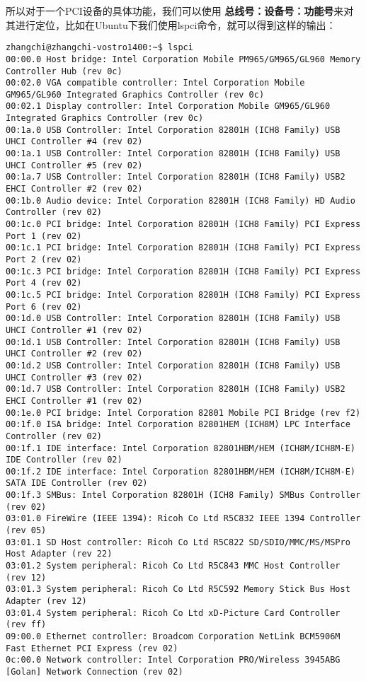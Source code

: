\documentclass{article}
\begin{document}
\begin{CJK*}{UTF8}{gkai}
\begin{description}
所以对于一个PCI设备的具体功能，我们可以使用 {\bfseries 总线号：设备号：功能号}来对其进行定位，比如在Ubuntu下我们使用lspci命令，就可以得到这样的输出：

\begin{lstlisting}[style=console, basicstyle=\tiny\color{green}\ttfamily\bfseries]
zhangchi@zhangchi-vostro1400:~$ lspci 
00:00.0 Host bridge: Intel Corporation Mobile PM965/GM965/GL960 Memory Controller Hub (rev 0c)
00:02.0 VGA compatible controller: Intel Corporation Mobile GM965/GL960 Integrated Graphics Controller (rev 0c)
00:02.1 Display controller: Intel Corporation Mobile GM965/GL960 Integrated Graphics Controller (rev 0c)
00:1a.0 USB Controller: Intel Corporation 82801H (ICH8 Family) USB UHCI Controller #4 (rev 02)
00:1a.1 USB Controller: Intel Corporation 82801H (ICH8 Family) USB UHCI Controller #5 (rev 02)
00:1a.7 USB Controller: Intel Corporation 82801H (ICH8 Family) USB2 EHCI Controller #2 (rev 02)
00:1b.0 Audio device: Intel Corporation 82801H (ICH8 Family) HD Audio Controller (rev 02)
00:1c.0 PCI bridge: Intel Corporation 82801H (ICH8 Family) PCI Express Port 1 (rev 02)
00:1c.1 PCI bridge: Intel Corporation 82801H (ICH8 Family) PCI Express Port 2 (rev 02)
00:1c.3 PCI bridge: Intel Corporation 82801H (ICH8 Family) PCI Express Port 4 (rev 02)
00:1c.5 PCI bridge: Intel Corporation 82801H (ICH8 Family) PCI Express Port 6 (rev 02)
00:1d.0 USB Controller: Intel Corporation 82801H (ICH8 Family) USB UHCI Controller #1 (rev 02)
00:1d.1 USB Controller: Intel Corporation 82801H (ICH8 Family) USB UHCI Controller #2 (rev 02)
00:1d.2 USB Controller: Intel Corporation 82801H (ICH8 Family) USB UHCI Controller #3 (rev 02)
00:1d.7 USB Controller: Intel Corporation 82801H (ICH8 Family) USB2 EHCI Controller #1 (rev 02)
00:1e.0 PCI bridge: Intel Corporation 82801 Mobile PCI Bridge (rev f2)
00:1f.0 ISA bridge: Intel Corporation 82801HEM (ICH8M) LPC Interface Controller (rev 02)
00:1f.1 IDE interface: Intel Corporation 82801HBM/HEM (ICH8M/ICH8M-E) IDE Controller (rev 02)
00:1f.2 IDE interface: Intel Corporation 82801HBM/HEM (ICH8M/ICH8M-E) SATA IDE Controller (rev 02)
00:1f.3 SMBus: Intel Corporation 82801H (ICH8 Family) SMBus Controller (rev 02)
03:01.0 FireWire (IEEE 1394): Ricoh Co Ltd R5C832 IEEE 1394 Controller (rev 05)
03:01.1 SD Host controller: Ricoh Co Ltd R5C822 SD/SDIO/MMC/MS/MSPro Host Adapter (rev 22)
03:01.2 System peripheral: Ricoh Co Ltd R5C843 MMC Host Controller (rev 12)
03:01.3 System peripheral: Ricoh Co Ltd R5C592 Memory Stick Bus Host Adapter (rev 12)
03:01.4 System peripheral: Ricoh Co Ltd xD-Picture Card Controller (rev ff)
09:00.0 Ethernet controller: Broadcom Corporation NetLink BCM5906M Fast Ethernet PCI Express (rev 02)
0c:00.0 Network controller: Intel Corporation PRO/Wireless 3945ABG [Golan] Network Connection (rev 02)
\end{lstlisting}


\end{description}
\end{CJK*}
\end{document}
